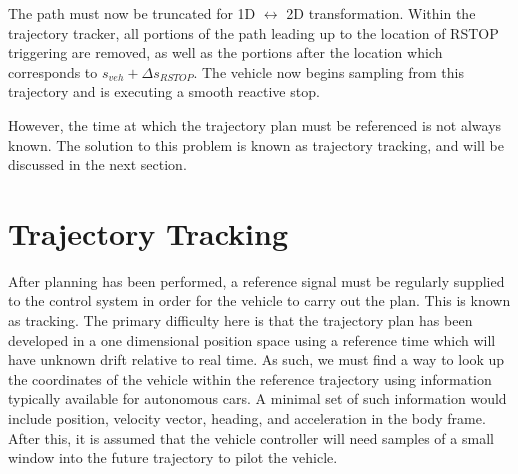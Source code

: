 \documentclass[letterpaper, 10 pt, conference]{ieeeconf}  %
\begin{document}
The path must now be truncated for 1D $\leftrightarrow$ 2D transformation.
Within the trajectory tracker, all portions of the path leading up to the location of RSTOP triggering are removed, as well as the portions after the location which corresponds to $s_{veh} + \Delta s_{RSTOP}$.
The vehicle now begins sampling from this trajectory and is executing a smooth reactive stop.


However, the time at which the trajectory plan must be referenced is not always known.
The solution to this problem is known as trajectory tracking, and will be discussed in the next section.



\section{Trajectory Tracking} \label{sec:trajectorytracking}

After planning has been performed, a reference signal must be regularly supplied to the control system in order for the vehicle to carry out the plan.
This is known as tracking.
The primary difficulty here is that the trajectory plan has been developed in a one dimensional position space using a reference time which will have unknown drift relative to real time.
As such, we must find a way to look up the coordinates of the vehicle within the reference trajectory using information typically available for autonomous cars.
A minimal set of such information would include position, velocity vector, heading, and acceleration in the body frame.
After this, it is assumed that the vehicle controller will need samples of a small window into the future trajectory to pilot the vehicle.
\end{document}
